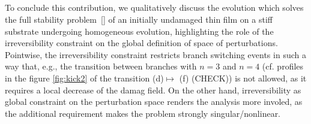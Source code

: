 \subsection{ }

To conclude this contribution, 
we qualitatively discuss the evolution which solves the full stability problem~\eqref{} of an initially undamaged thin film on a stiff substrate undergoing homogeneous evolution, highlighting the role of the irreversibility constraint on the global definition of space of perturbations.
Pointwise, the irreversibility constraint restricts branch switching events in such a way that, e.g., the transition between branches with $n=3$ and $n=4$  (cf. profiles in the figure \ref{fig:kick2} of the transition (d)$\mapsto$ (f) (CHECK)) is not allowed, as it requires a local decrease of the damag field. On the other hand, irreversibility as global constraint on the perturbation space renders the analysis more involed, as the additional requirement makes the problem strongly singular/nonlinear.

